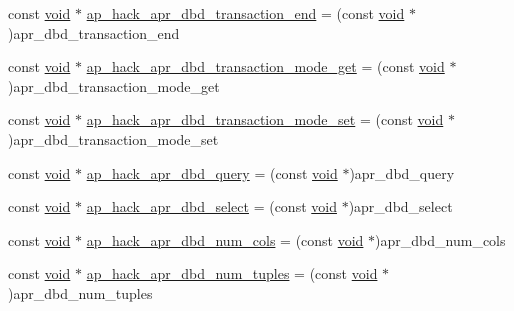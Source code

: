 \begin{DoxyCompactItemize}
\item 
const \hyperlink{group__MOD__ISAPI_gacd6cdbf73df3d9eed42fa493d9b621a6}{void} $\ast$ \hyperlink{srclib_2apr-util_2exports_8c_a8e95a5ecf5e77231844b1bc3c45ba301}{ap\+\_\+hack\+\_\+apr\+\_\+dbd\+\_\+transaction\+\_\+end} = (const \hyperlink{group__MOD__ISAPI_gacd6cdbf73df3d9eed42fa493d9b621a6}{void} $\ast$)apr\+\_\+dbd\+\_\+transaction\+\_\+end
\item 
const \hyperlink{group__MOD__ISAPI_gacd6cdbf73df3d9eed42fa493d9b621a6}{void} $\ast$ \hyperlink{srclib_2apr-util_2exports_8c_a931110050f1f64d7a29ff60663d1d45a}{ap\+\_\+hack\+\_\+apr\+\_\+dbd\+\_\+transaction\+\_\+mode\+\_\+get} = (const \hyperlink{group__MOD__ISAPI_gacd6cdbf73df3d9eed42fa493d9b621a6}{void} $\ast$)apr\+\_\+dbd\+\_\+transaction\+\_\+mode\+\_\+get
\item 
const \hyperlink{group__MOD__ISAPI_gacd6cdbf73df3d9eed42fa493d9b621a6}{void} $\ast$ \hyperlink{srclib_2apr-util_2exports_8c_ad15394b4cf6f8c3a0c178dbb80429c74}{ap\+\_\+hack\+\_\+apr\+\_\+dbd\+\_\+transaction\+\_\+mode\+\_\+set} = (const \hyperlink{group__MOD__ISAPI_gacd6cdbf73df3d9eed42fa493d9b621a6}{void} $\ast$)apr\+\_\+dbd\+\_\+transaction\+\_\+mode\+\_\+set
\item 
const \hyperlink{group__MOD__ISAPI_gacd6cdbf73df3d9eed42fa493d9b621a6}{void} $\ast$ \hyperlink{srclib_2apr-util_2exports_8c_a9c69a9ec8ab1a59fb6400ce096c073f1}{ap\+\_\+hack\+\_\+apr\+\_\+dbd\+\_\+query} = (const \hyperlink{group__MOD__ISAPI_gacd6cdbf73df3d9eed42fa493d9b621a6}{void} $\ast$)apr\+\_\+dbd\+\_\+query
\item 
const \hyperlink{group__MOD__ISAPI_gacd6cdbf73df3d9eed42fa493d9b621a6}{void} $\ast$ \hyperlink{srclib_2apr-util_2exports_8c_a4ce6d3597bb7d9d4757fcfafb586f7f7}{ap\+\_\+hack\+\_\+apr\+\_\+dbd\+\_\+select} = (const \hyperlink{group__MOD__ISAPI_gacd6cdbf73df3d9eed42fa493d9b621a6}{void} $\ast$)apr\+\_\+dbd\+\_\+select
\item 
const \hyperlink{group__MOD__ISAPI_gacd6cdbf73df3d9eed42fa493d9b621a6}{void} $\ast$ \hyperlink{srclib_2apr-util_2exports_8c_a0bc2e7f65a3ef976aa1628a50d037861}{ap\+\_\+hack\+\_\+apr\+\_\+dbd\+\_\+num\+\_\+cols} = (const \hyperlink{group__MOD__ISAPI_gacd6cdbf73df3d9eed42fa493d9b621a6}{void} $\ast$)apr\+\_\+dbd\+\_\+num\+\_\+cols
\item 
const \hyperlink{group__MOD__ISAPI_gacd6cdbf73df3d9eed42fa493d9b621a6}{void} $\ast$ \hyperlink{srclib_2apr-util_2exports_8c_ab7c85540657d1efff1cdd9d3bcd2f788}{ap\+\_\+hack\+\_\+apr\+\_\+dbd\+\_\+num\+\_\+tuples} = (const \hyperlink{group__MOD__ISAPI_gacd6cdbf73df3d9eed42fa493d9b621a6}{void} $\ast$)apr\+\_\+dbd\+\_\+num\+\_\+tuples

\end{DoxyCompactItemize}
